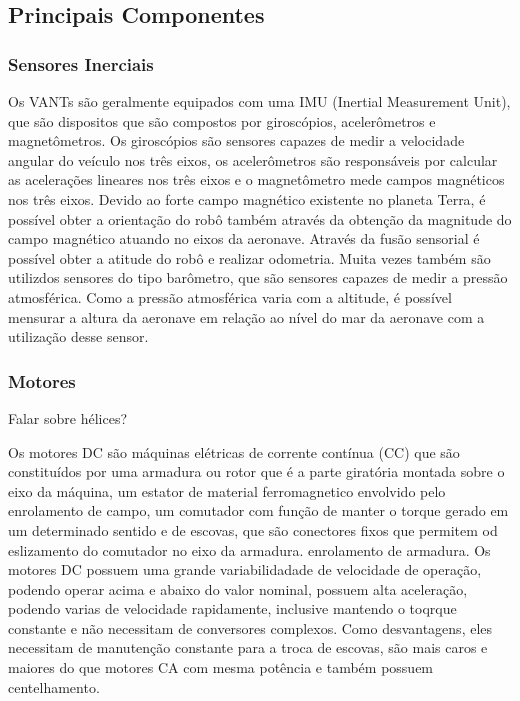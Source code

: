 \subsection{Principais Componentes}

\subsubsection{Sensores Inerciais}

Os VANTs são geralmente equipados com uma IMU (Inertial Measurement Unit), que são dispositos que são compostos por giroscópios, acelerômetros e magnetômetros. Os giroscópios são sensores capazes de medir a velocidade angular do veículo nos três eixos, os acelerômetros são responsáveis por calcular as acelerações lineares nos três eixos e o magnetômetro mede campos magnéticos nos três eixos. Devido ao forte campo magnético existente no planeta Terra, é possível obter a orientação do robô também através da obtenção da magnitude do campo magnético atuando no eixos da aeronave. Através da fusão sensorial é possível obter a atitude do robô e realizar odometria. Muita vezes também são utilizdos sensores do tipo barômetro, que são sensores capazes de medir a pressão atmosférica. Como a pressão atmosférica varia com a altitude, é possível mensurar a altura da aeronave em relação ao nível do mar da aeronave com a utilização desse sensor.

\subsubsection{Motores}

Falar sobre hélices?

Os motores DC são máquinas elétricas de corrente contínua (CC) que são constituídos por uma armadura ou rotor que é a parte giratória montada sobre o eixo da máquina, um estator de material ferromagnetico envolvido pelo enrolamento de campo, um comutador com função de manter o torque gerado em um determinado sentido e de escovas, que são conectores fixos que permitem od eslizamento do comutador no eixo da armadura. enrolamento de armadura. Os motores DC possuem uma grande variabilidadade de velocidade de operação, podendo operar acima e abaixo do valor nominal, possuem alta aceleração, podendo varias de velocidade rapidamente, inclusive mantendo o toqrque constante e não necessitam de conversores complexos. Como desvantagens, eles necessitam de manutenção constante para a troca de escovas, são mais caros e maiores do que motores CA com mesma potência e também possuem centelhamento.

